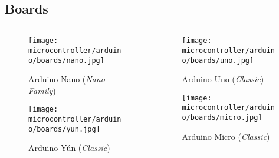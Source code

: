 \documentclass[aspectratio=169]{beamer}
\begin{document}
\subsection{Boards}
\begin{frame}
    \begin{columns}
        \begin{column}{0.5\textwidth}
            \begin{figure}
                \texttt{[image: microcontroller/arduino/boards/nano.jpg]}
                \caption{Arduino\textregistered{} Nano (\textit{Nano Family})}
            \end{figure}
            \begin{figure}
                \texttt{[image: microcontroller/arduino/boards/yun.jpg]}
                \caption{Arduino\textregistered{} Yún (\textit{Classic})}
            \end{figure}
        \end{column}
        \begin{column}{0.5\textwidth}
            \begin{figure}
                \texttt{[image: microcontroller/arduino/boards/uno.jpg]}
                \caption{Arduino\textregistered{} Uno (\textit{Classic})}
            \end{figure}
            \begin{figure}
                \texttt{[image: microcontroller/arduino/boards/micro.jpg]}
                \caption{Arduino\textregistered{} Micro (\textit{Classic})}
            \end{figure}
        \end{column}
    \end{columns}
\end{frame}
\end{document}

